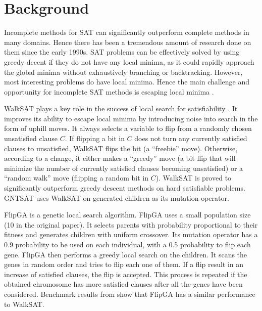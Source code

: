 \section{Background}
Incomplete methods for SAT can significantly outperform complete methods in
many domains. Hence there has been a tremendous amount of research done on them
since the early 1990s. SAT problems can be effectively solved by using greedy
decent if they do not have any local minima, as it could rapidly approach the
global minima without exhaustively branching or backtracking. However, most
interesting problems do have local minima. Hence the main challenge and
opportunity for incomplete SAT methods is escaping local minima
\parencite{biere2009handbook}.

WalkSAT \parencite{selman1994noise} plays a key role in the success of local search
for satisfiability \parencite{biere2009handbook}. It improves its ability to escape
local minima by introducing noise into search in the form of uphill moves. It
always selects a variable to flip from a randomly chosen unsatisfied clause
$C$. If flipping a bit in $C$  does not
turn any currently satisfied clauses to unsatisfied, WalkSAT flips the bit (a
``freebie'' move). Otherwise, according to a change, it either makes a
``greedy'' move (a bit flip that will minimize the number of currently
satisfied clauses becoming unsatisfied) or a ``random walk'' move (flipping a
random bit in $C$). WalkSAT is proved to significantly
outperform greedy descent methods on hard satisfiable problems. GNTSAT uses
WalkSAT on generated children as its mutation operator.


FlipGA \parencite{marchiori1999flipping} is a genetic local search algorithm. FlipGA uses
a small population size (10 in the original paper). It selects parents with
probability proportional to their fitness and generates children with uniform
crossover. Its mutation operator has a 0.9 probability to be used on each
individual, with a 0.5 probability to flip each gene. FlipGA then performs a
greedy local search on the children. It scans the genes in random order and
tries to flip each one of them. If a flip result in an increase of satisfied
clauses, the flip is accepted. This process is repeated if the obtained
chromosome has more satisfied clauses after all the genes have been
considered. Benchmark results from \cite{gottlieb_marchiori_rossi_2002} show that FlipGA has
a similar performance to WalkSAT.

